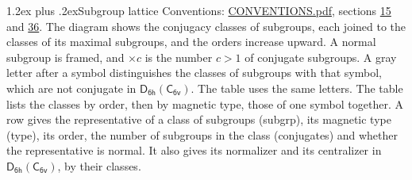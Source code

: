 \documentclass[10pt,a4paper]{article}
\makeatletter
\renewcommand\section{\@startsection{section}{1}{\z@}{-3ex plus -1ex minus -.2ex}%
  {1.2ex plus .2ex}{\normalfont\large\sffamily\bfseries\color{parttitle}}}
\numberwithin{equation}{section}
\newcommand{\grp}[1]{\mathsf{#1}}
\makeatother
\begin{document}
\section{Subgroup lattice}\label{s:subgroups}
Conventions: \href{../../CONVENTIONS.pdf}{CONVENTIONS.pdf}, sections \href{../../../rotation/CONVENTIONS.pdf\#conv.15}{15} and \href{../../CONVENTIONS.pdf\#conv.36}{36}.
The diagram shows the conjugacy classes of subgroups, each joined to the classes of its maximal subgroups, and the orders increase upward. \label{n:index.conjugates.c}\label{n:mark.conjugates}A normal subgroup is framed, and ${\times}c$ is the number $c > 1$ of conjugate subgroups. \label{n:mark.letter}A gray letter after a symbol distinguishes the classes of subgroups with that symbol, which are not conjugate in $\grp{D_{6h}}(\grp{C_{6v}})$. The table uses the same letters. The table lists the classes by order, then by magnetic type, those of one symbol together. \label{n:head.subgroup}\label{n:head.magnetic.type}\label{n:head.order}\label{n:head.conjugates}\label{n:head.normal}A row gives the representative of a class of subgroups (subgrp), its magnetic type (type), its order, the number of subgroups in the class (conjugates) and whether the representative is normal. \label{n:head.normalizer}\label{n:head.centralizer}It also gives its normalizer and its centralizer in $\grp{D_{6h}}(\grp{C_{6v}})$, by their classes. 
\end{document}
